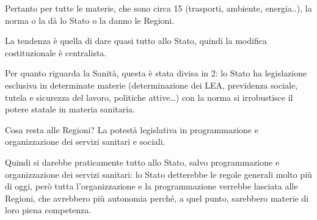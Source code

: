 \documentclass[]{article}
\begin{document}
Pertanto per tutte le materie, che sono circa 15 (trasporti, ambiente,
energia..), la norma o la dà lo Stato o la danno le Regioni.

La tendenza è quella di dare quasi tutto allo Stato, quindi la modifica
costituzionale è centralista.

Per quanto riguarda la Sanità, questa è stata divisa in 2: lo Stato ha
legislazione esclusiva in determinate materie (determinazione dei LEA,
previdenza sociale, tutela e sicurezza del lavoro, politiche
attive\ldots{}) con la norma si irrobustisce il potere statale in
materia sanitaria.

Cosa resta alle Regioni? La potestà legislativa in programmazione e
organizzazione dei servizi sanitari e sociali.

Quindi si darebbe praticamente tutto allo Stato, salvo programmazione e
organizzazione dei servizi sanitari: lo Stato detterebbe le regole
generali molto più di oggi, però tutta l'organizzazione e la
programmazione verrebbe lasciata alle Regioni, che avrebbero più
autonomia perché, a quel punto, sarebbero materie di loro piena
competenza.
\end{document}
